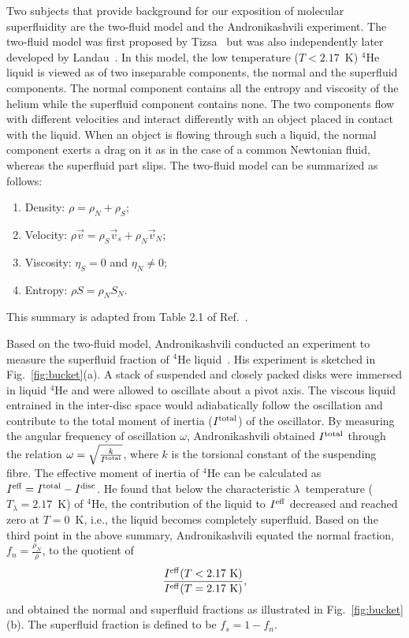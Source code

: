 \documentclass[12pt]{iopart}
\begin{document}
Two subjects that provide background for our exposition of molecular superfluidity are the two-fluid model and the Andronikashvili experiment. 
The two-fluid model was first proposed by Tizsa~\cite{tisza_2fluid, tisza_2flud_2} but was also independently later developed  by Landau~\cite{landau41}. 
In this model,  the low temperature ($T < 2.17$~K) $^4$He liquid is viewed as of two inseparable components, the normal and the superfluid components. The normal component contains all the entropy and viscosity of the helium while the superfluid component contains none. 
The two components flow with different velocities and interact differently with an object placed in contact with the liquid. 
When an object is flowing through such a liquid, the normal component exerts a drag on it as in the case of a common Newtonian fluid, 
whereas the superfluid part slips. 
The two-fluid model can be summarized as follows:
\begin{enumerate}
\item Density: $\rho=\rho_N + \rho_S$;
\item Velocity: $\rho \vec{v} = \rho_S \vec{v}_s+ \rho_N \vec{v}_N$;
\item Viscosity: $\eta_S=0$ and $\eta_N\ne 0$;
\item Entropy: $\rho S=\rho_N S_N$.
\end{enumerate}
This summary is adapted from Table 2.1 of Ref.~\cite{basic_superflu}.

Based on the two-fluid model, Andronikashvili conducted an experiment to measure the superfluid fraction of $^4$He liquid~\cite{andron_bucket_1,andron_bucket_2}.
His experiment is sketched in Fig.~\ref{fig:bucket}(a). 
A stack of suspended and closely packed disks were immersed in liquid $^4$He and were allowed to oscillate about a pivot axis. 
The viscous liquid entrained in the inter-disc space would adiabatically follow the oscillation and contribute to the total moment of inertia ($I^{\rm total}$) 
of the oscillator. 
By measuring the angular frequency of oscillation $\omega$, Andronikashvili obtained $I^{\rm total}$ through the relation $\omega=\sqrt{\frac{k}{I^{\rm total}}}$, where $k$ is the torsional constant of the suspending fibre. 
The effective moment of inertia of $^4$He can be calculated as $I^{\rm eff}=I^{\rm total}-I^{\rm disc}$.  
He found that below the characteristic $\lambda$~temperature ($T_{\lambda}=2.17$~K) of $^4$He, 
the contribution of the liquid to $I^{\rm eff}$ decreased and reached zero at $T=0$~K, i.e., the liquid becomes completely superfluid. 
Based on the third point in the above summary, Andronikashvili equated the normal fraction, $f_n=\frac{\rho_N}{\rho}$, to the quotient of 
\begin{eqnarray}
\frac{I^{\rm eff}(T < 2.17~{\rm K})}{I^{\rm eff} (T=2.17~{\rm K})},
\end{eqnarray}
and obtained the normal and superfluid fractions as illustrated in Fig.~\ref{fig:bucket}(b). 
The superfluid fraction is defined to be $f_s=1-f_n$.
\end{document}
